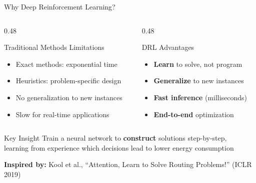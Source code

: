 \documentclass[aspectratio=169,11pt]{beamer}
\begin{document}
\begin{frame}{Why Deep Reinforcement Learning?}
    \begin{columns}[T]
        \begin{column}{0.48\textwidth}
            \begin{alertblock}{Traditional Methods Limitations}
                \begin{itemize}
                    \item Exact methods: exponential time
                    \item Heuristics: problem-specific design
                    \item No generalization to new instances
                    \item Slow for real-time applications
                \end{itemize}
            \end{alertblock}
        \end{column}
        \begin{column}{0.48\textwidth}
            \begin{exampleblock}{DRL Advantages}
                \begin{itemize}
                    \item \textbf{Learn} to solve, not program
                    \item \textbf{Generalize} to new instances
                    \item \textbf{Fast inference} (milliseconds)
                    \item \textbf{End-to-end} optimization
                \end{itemize}
            \end{exampleblock}
        \end{column}
    \end{columns}
    
    \vspace{0.5cm}
    \begin{block}{Key Insight}
        \centering
        Train a neural network to \textbf{construct} solutions step-by-step,\\
        learning from experience which decisions lead to lower energy consumption
    \end{block}
    
    \vspace{0.3cm}
    \begin{center}
        \textbf{Inspired by:} Kool et al., ``Attention, Learn to Solve Routing Problems!'' (ICLR 2019)
    \end{center}
\end{frame}
\end{document}

